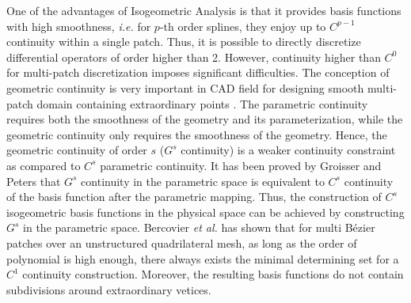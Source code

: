 One of the advantages of Isogeometric Analysis is that it provides basis functions with high smoothness, \textit{i.e.} for $p$-th order splines, they enjoy up to $C^{p-1}$ continuity within a single patch. Thus, it is possible to directly discretize differential operators of order higher than 2. However, continuity higher than $C^0$ for multi-patch discretization imposes significant difficulties. The conception of geometric continuity is very important in CAD field \cite{peters_chapter_2002} for designing smooth multi-patch domain containing extraordinary points \cite{peters_joining_1992}. The parametric continuity requires both the smoothness of the geometry and its parameterization, while the geometric continuity only requires the smoothness of the geometry. Hence, the geometric continuity of order $s$ ($G^s$ continuity) is a weaker continuity constraint as compared to $C^s$ parametric continuity. It has been proved by Groisser and Peters \cite{groisser_matched_2015} that $G^s$ continuity in the parametric space is equivalent to $C^s$ continuity of the basis function after the parametric mapping. Thus, the construction of $C^s$ isogeometric basis functions in the physical space can be achieved by constructing $G^s$ in the parametric space. Bercovier \textit{et al.} \cite{bercovier_smooth_2014} has shown that for multi B\'ezier patches over an unstructured quadrilateral mesh, as long as the order of polynomial is high enough, there always exists the minimal determining set for a $C^1$ continuity construction. Moreover, the resulting basis functions do not contain subdivisions around extraordinary vetices.\par

